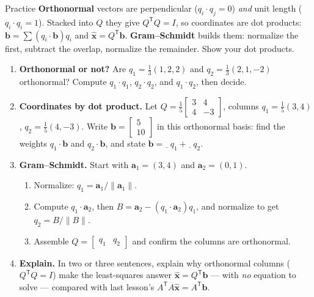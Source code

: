 \documentclass[10pt]{article}
\newcommand{\xx}{\mathbf{x}}
\newcommand{\bb}{\mathbf{b}}
\newcommand{\avec}{\mathbf{a}}
\newcommand{\T}{\mathsf{T}}
\begin{document}
\namedateperiod

\vspace{0.12in}

\begin{notesbox}{Practice}
\textbf{Orthonormal} vectors are perpendicular ($q_i\cdot q_j=0$) \emph{and} unit length ($q_i\cdot q_i=1$).
Stacked into $Q$ they give $Q^{\T}Q=I$, so coordinates are dot products: $\bb=\sum(q_i\cdot\bb)q_i$ and
$\hat{\xx}=Q^{\T}\bb$. \textbf{Gram--Schmidt} builds them: normalize the first, subtract the overlap,
normalize the remainder. Show your dot products.

\begin{enumerate}[leftmargin=1.9em, itemsep=11pt]
  \item \textbf{Orthonormal or not?} Are $q_1=\tfrac13(1,2,2)$ and $q_2=\tfrac13(2,1,-2)$ orthonormal?
        Compute $q_1\!\cdot\!q_1$, $q_2\!\cdot\!q_2$, and $q_1\!\cdot\!q_2$, then decide. 
  \item \textbf{Coordinates by dot product.} Let $Q=\tfrac15\begin{bmatrix} 3&4\\4&-3 \end{bmatrix}$, columns
        $q_1=\tfrac15(3,4)$, $q_2=\tfrac15(4,-3)$. Write $\bb=\begin{bmatrix} 5\\10 \end{bmatrix}$ in this
        orthonormal basis: find the weights $q_1\!\cdot\!\bb$ and $q_2\!\cdot\!\bb$, and state
        $\bb=\underline{\ \ }\,q_1+\underline{\ \ }\,q_2$. 
  \item \textbf{Gram--Schmidt.} Start with $\avec_1=(3,4)$ and $\avec_2=(0,1)$.
    \begin{enumerate}[label=(\alph*), leftmargin=1.8em, itemsep=5pt]
      \item Normalize: $q_1=\avec_1/\|\avec_1\|$. \vspace{0.7cm}
      \item Compute $q_1\!\cdot\!\avec_2$, then $B=\avec_2-(q_1\!\cdot\!\avec_2)q_1$, and normalize to get
            $q_2=B/\|B\|$. \vspace{1.3cm}
      \item Assemble $Q=\begin{bmatrix} q_1 & q_2 \end{bmatrix}$ and confirm the columns are orthonormal.
            \vspace{0.9cm}
    \end{enumerate}
  \item \textbf{Explain.} In two or three sentences, explain why orthonormal columns ($Q^{\T}Q=I$) make the
        least-squares answer $\hat{\xx}=Q^{\T}\bb$ --- with \emph{no} equation to solve --- compared with
        last lesson's $A^{\T}A\hat{\xx}=A^{\T}\bb$. 
\end{enumerate}
\end{notesbox}
\end{document}
